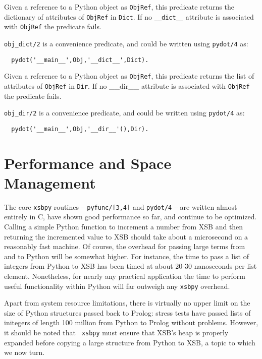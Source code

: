 \begin{description}
%
Given a reference to a Python object as {\tt ObjRef}, this predicate
returns the dictionary of attributes of {\tt ObjRef} in {\tt Dict}.
If no {\tt \_\_dict\_\_} attribute is associated with {\tt ObjRef} the
predicate fails.

{\tt obj\_dict/2} is a convenience predicate, and could be written
using {\tt pydot/4} as:

\begin{verbatim}
  pydot('__main__',Obj,'__dict__',Dict).
\end{verbatim}

%
Given a reference to a Python object as {\tt ObjRef}, this predicate
returns the list of attributes of {\tt ObjRef} in {\tt Dir}.  If no
\_\_dir\_\_ attribute is associated with {\tt ObjRef} the predicate
fails.

{\tt obj\_dir/2} is a convenience predicate, and could be written
using {\tt pydot/4} as:

\begin{verbatim}
  pydot('__main__',Obj,'__dir__'(),Dir).
\end{verbatim}

\end{description}

\section{Performance and Space Management}

The core {\tt xsbpy} routines -- {\tt pyfunc/[3,4]} and {\tt pydot/4}
-- are written almost entirely in C, have shown good performance so
far, and continue to be optimized.  Calling a simple Python function
to increment a number from XSB and then returning the incremented
value to XSB should take about a microsecond on a reasonably fast
machine.  Of course, the overhead for passing large terms from and to
Python will be somewhat higher.  For instance, the time to pass a list
of integers from Python to XSB has been timed at about 20-30
nanoseconds per list element.  Nonetheless, for nearly any practical
application the time to perform useful functionality within Python
will far outweigh any {\tt xsbpy} overhead.

Apart from system resource limitations, there is virtually no upper
limit on the size of Python structures passed back to Prolog: stress
tests have passed lists of initegers of length 100 million from Python
to Prolog without problems. However, it should be noted that {\tt
  xsbpy} must ensure that XSB's heap is properly expanded before
copying a large structure from Python to XSB, a topic to which we now
turn.

